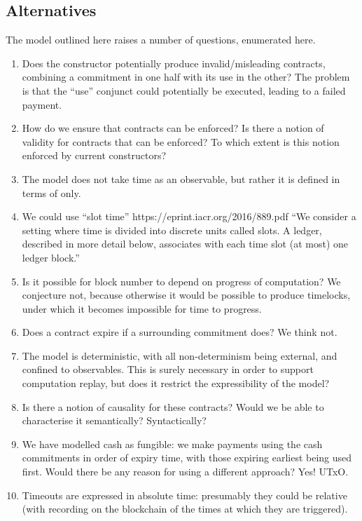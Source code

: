 \documentclass[
      acmsmall
    , screen
    , review=true
  ]{acmart}
\begin{document}
\subsection{Alternatives}

The model outlined here raises a number of questions, enumerated here.


\begin{enumerate}
\item Does the  constructor potentially produce invalid/misleading contracts, combining a commitment in one half with its use in the other? The problem is that the ``use'' conjunct could potentially be executed, leading to a failed payment.
\item How do we ensure that contracts can be enforced? Is there a notion of validity for contracts that can be enforced? To which extent is this notion enforced by current constructors?
\item The model does not take time as an observable, but rather it is defined in terms of  only. 
\item We could use ``slot time'' https://eprint.iacr.org/2016/889.pdf ``We consider a setting where time is divided into discrete units called slots. A ledger, described in more detail below, associates with each time slot (at most) one ledger block.''
\item Is it possible for block number to depend on progress of computation? We conjecture not, because otherwise it would be possible to produce timelocks, under which it becomes impossible for time to progress. 
\item Does a contract expire if a surrounding commitment does? We think not.
\item The model is deterministic, with all non-determinism being external, and confined to observables. This is surely necessary in order to support computation replay, but does it restrict the expressibility of the model?
\item Is there a notion of causality for these contracts? Would we be able to characterise it semantically? Syntactically?
\item We have modelled cash as fungible: we make payments using the cash commitments in order of expiry time, with those expiring earliest being used first. Would there be any reason for using a different approach? Yes! UTxO.
\item Timeouts are expressed in absolute time: presumably they could be relative (with recording on the blockchain of the times at which they are triggered).

\end{enumerate}
\end{document}
